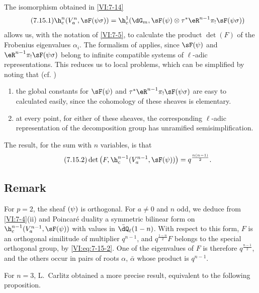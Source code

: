 \documentclass[oneside]{book}
\begin{document}
The isomorphism obtained in \ref{VI:7-14} 
\begin{equation*}\tag{7.15.1}\label{VI:eq:7-15-1}
  \h_c^n(V_a^n,\sF(\psi\sigma)) = \h_c^1(\dG_m,\sF(\psi)\otimes \tau^\ast \eR^{n-1} \pi_! \sF(\psi\sigma)) 
\end{equation*}
allows us, with the notation of \ref{VI:7-5}, to calculate the product $\det(F)$ 
of the Frobenius eigenvalues $\alpha_i$. The formalism of \cite{de73} 
applies, since $\sF(\psi)$ and $\eR^{n-1} \pi_! \sF(\psi\sigma)$ 
belong to infinite compatible systems of $\ell$-adic 
representations. This reduces us to local problems, which can be 
simplified by noting that (cf. \cite[9.5]{de73}) 
\begin{enumerate}[\indent a)]
  \item the global constants for 
    $\sF(\psi)$ and $\tau^\ast \eR^{n-1} \pi_! \sF(\psi\sigma)$ are easy to 
    calculated easily, since the cohomology of these sheaves is elementary. 
  \item at every point, for either of these sheaves, the 
    corresponding $\ell$-adic representation of the decomposition group 
    has unramified semisimplification. 
\end{enumerate}

The result, for the sum with $n$ variables, is that 
\begin{equation*}\tag{7.15.2}\label{VI:eq:7-15-2}
  \det\left(F,\h_c^{n-1}(V_a^{n-1},\sF(\psi))\right) = q^{\frac{n(n-1)}{2}} \text{.} 
\end{equation*}





\subsection{Remark}\label{VI:7-16}

For $p=2$, the sheaf $\sf(\psi)$ is orthogonal. For $a\ne 0$ and $n$ 
odd, we deduce from \ref{VI:7-4}(ii) and Poincaré duality a 
symmetric bilinear form on $\h_c^{n-1}(V_a^{n-1},\sF(\psi))$ with 
values in $\bar\dQ_\ell(1-n)$. With respect to this form, $F$ is an 
orthogonal similitude of multiplier $q^{n-1}$, and $q^{\frac{1-n}{2}} F$ 
belongs to the special orthogonal group, by \eqref{VI:eq:7-15-2}. One 
of the eigenvalues of $F$ is therefore $q^{\frac{n-1}{2}}$, and the others 
occur in pairs of roots $\alpha$, $\bar\alpha$ whose product is $q^{n-1}$. 

For $n=3$, L.\ Carlitz \cite{ca69-2} obtained a more precise result, 
equivalent to the following proposition. 
\end{document}
